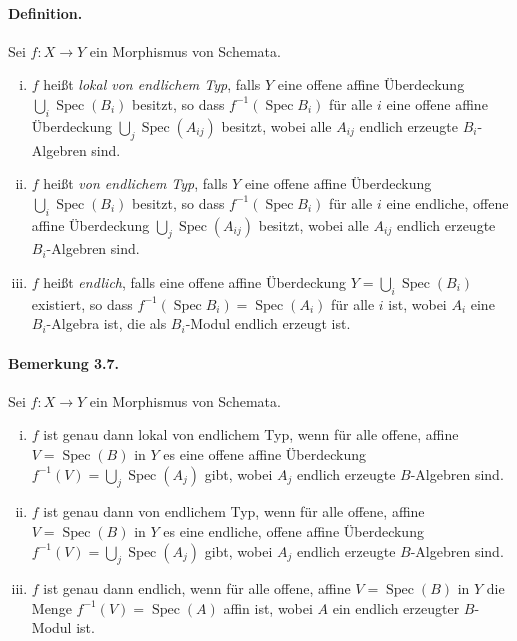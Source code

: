 \paragraph{Definition.} Sei $f:X\to Y$ ein Morphismus von Schemata.
\begin{enumerate}[(i)]
\item $f$ heißt \textit{lokal von endlichem Typ}, falls $Y$ eine offene affine Überdeckung $\bigcup_i\operatorname{Spec}(B_i)$ besitzt, so dass $f^{-1}(\operatorname{Spec}B_i)$ für alle $i$ eine offene affine Überdeckung $\bigcup_j\operatorname{Spec}(A_{ij})$ besitzt, wobei alle $A_{ij}$ endlich erzeugte $B_i$-Algebren sind.
\item $f$ heißt \textit{von endlichem Typ}, falls $Y$ eine offene affine Überdeckung $\bigcup_i\operatorname{Spec}(B_i)$ besitzt, so dass $f^{-1}(\operatorname{Spec}B_i)$ für alle $i$ eine endliche, offene affine Überdeckung $\bigcup_j\operatorname{Spec}(A_{ij})$ besitzt, wobei alle $A_{ij}$ endlich erzeugte $B_i$-Algebren sind.
\item $f$ heißt \textit{endlich}, falls eine offene affine Überdeckung $Y=\bigcup_i\operatorname{Spec}(B_i)$ existiert, so dass $f^{-1}(\operatorname{Spec}B_i)=\operatorname{Spec}(A_i)$ für alle $i$ ist, wobei $A_i$ eine $B_i$-Algebra ist, die als $B_i$-Modul endlich erzeugt ist.
\end{enumerate}

\paragraph{Bemerkung 3.7.}\label{3.7} Sei $f:X\to Y$ ein Morphismus von Schemata.
\begin{enumerate}[(i)]
\item $f$ ist genau dann lokal von endlichem Typ, wenn für alle offene, affine $V=\operatorname{Spec}(B)$ in $Y$ es eine offene affine Überdeckung $f^{-1}(V)=\bigcup_j\operatorname{Spec}(A_j)$ gibt, wobei $A_j$ endlich erzeugte $B$-Algebren sind.
\item $f$ ist genau dann von endlichem Typ, wenn für alle offene, affine $V=\operatorname{Spec}(B)$ in $Y$ es eine endliche, offene affine Überdeckung $f^{-1}(V)=\bigcup_j\operatorname{Spec}(A_j)$ gibt, wobei $A_j$ endlich erzeugte $B$-Algebren sind.
\item $f$ ist genau dann endlich, wenn für alle offene, affine $V=\operatorname{Spec}(B)$ in $Y$ die Menge $f^{-1}(V)=\operatorname{Spec}(A)$ affin ist, wobei $A$ ein endlich erzeugter $B$-Modul ist.
\end{enumerate}


